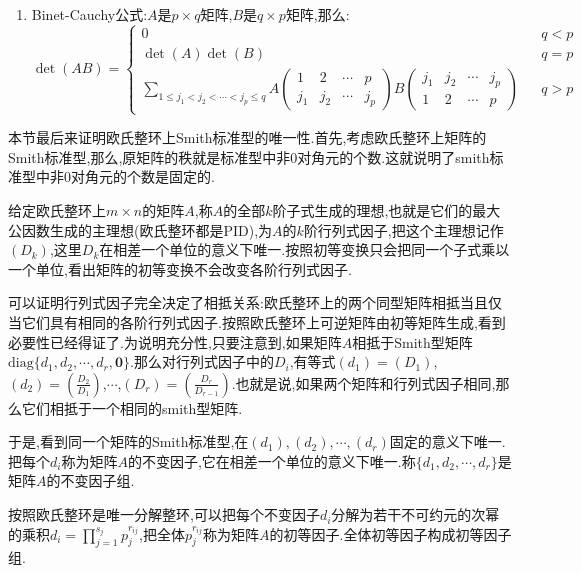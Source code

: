 \begin{enumerate}
\begin{enumerate}
$$\begin{array}{cccc}
		1&2&\cdots&r\\
		k_1&k_2&\cdots&k_r
		\end{array}\right)A\left(
		\begin{array}{cccc}
		r+1&r+2&\cdots&n\\
		k_{r+1}&k_{r+2}&\cdots&k_n
		\end{array}\right)$$
	\end{enumerate}
	\item Binet-Cauchy公式:$A$是$p\times q$矩阵,$B$是$q\times p$矩阵,那么:
	$$\det(AB)=\left\{
	\begin{array}{lcl}
	0 & & q<p \\
	\det(A)\det(B) &  &q=p \\
	\sum_{1\le j_1<j_2<\cdots<j_p\le q}A\left(\begin{array}{cccc}
	1&2&\cdots&p\\
	j_1&j_2&\cdots&j_p
	\end{array}\right)B\left(\begin{array}{cccc}
	j_1&j_2&\cdots&j_p\\
	1&2&\cdots&p
	\end{array}\right) &  &q>p
	\end{array}\right.$$
\end{enumerate}

本节最后来证明欧氏整环上Smith标准型的唯一性.首先,考虑欧氏整环上矩阵的Smith标准型,那么,原矩阵的秩就是标准型中非0对角元的个数.这就说明了smith标准型中非0对角元的个数是固定的.

给定欧氏整环上$m\times n$的矩阵$A$,称$A$的全部$k$阶子式生成的理想,也就是它们的最大公因数生成的主理想(欧氏整环都是PID),为$A$的$k$阶行列式因子,把这个主理想记作$(D_k)$,这里$D_k$在相差一个单位的意义下唯一.按照初等变换只会把同一个子式乘以一个单位,看出矩阵的初等变换不会改变各阶行列式因子.

可以证明行列式因子完全决定了相抵关系:欧氏整环上的两个同型矩阵相抵当且仅当它们具有相同的各阶行列式因子.按照欧氏整环上可逆矩阵由初等矩阵生成,看到必要性已经得证了.为说明充分性,只要注意到,如果矩阵$A$相抵于Smith型矩阵$\mathrm{diag}\{d_1,d_2,\cdots,d_r,\textbf{0}\}$.那么对行列式因子中的$D_i$,有等式$(d_1)=(D_1)$,$(d_2)=(\frac{D_2}{D_1})$,$\cdots$,$(D_r)=(\frac{D_{r}}{D_{r-1}})$.也就是说,如果两个矩阵和行列式因子相同,那么它们相抵于一个相同的smith型矩阵.

于是,看到同一个矩阵的Smith标准型,在$(d_1),(d_2),\cdots,(d_r)$固定的意义下唯一.把每个$d_i$称为矩阵$A$的不变因子,它在相差一个单位的意义下唯一.称$\{d_1,d_2,\cdots,d_r\}$是矩阵$A$的不变因子组.

按照欧氏整环是唯一分解整环,可以把每个不变因子$d_i$分解为若干不可约元的次幂的乘积$d_i=\prod_{j=1}^{s_j}p_{j}^{r_{ij}}$,把全体$p_j^{r_{ij}}$称为矩阵$A$的初等因子.全体初等因子构成初等因子组.

